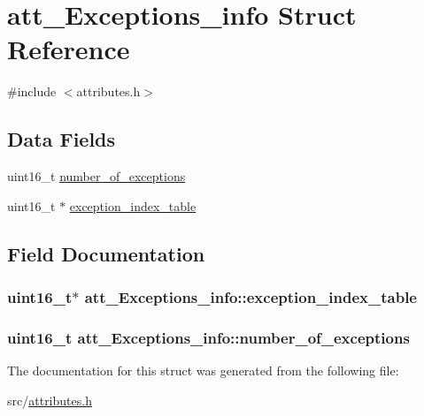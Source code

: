 \hypertarget{structatt__Exceptions__info}{}\section{att\+\_\+\+Exceptions\+\_\+info Struct Reference}
\label{structatt__Exceptions__info}


{\ttfamily \#include $<$attributes.\+h$>$}

\subsection*{Data Fields}
\begin{DoxyCompactItemize}
\item 
uint16\+\_\+t \hyperlink{structatt__Exceptions__info_aa118cef845f2ff9472572598b79ef635}{number\+\_\+of\+\_\+exceptions}
\item 
uint16\+\_\+t $\ast$ \hyperlink{structatt__Exceptions__info_ae713b303537b79289f22216ddbcbfd56}{exception\+\_\+index\+\_\+table}
\end{DoxyCompactItemize}


\subsection{Field Documentation}
\subsubsection[{\texorpdfstring{exception\+\_\+index\+\_\+table}{exception_index_table}}]{\setlength{\rightskip}{0pt plus 5cm}uint16\+\_\+t$\ast$ att\+\_\+\+Exceptions\+\_\+info\+::exception\+\_\+index\+\_\+table}\hypertarget{structatt__Exceptions__info_ae713b303537b79289f22216ddbcbfd56}{}\label{structatt__Exceptions__info_ae713b303537b79289f22216ddbcbfd56}
\subsubsection[{\texorpdfstring{number\+\_\+of\+\_\+exceptions}{number_of_exceptions}}]{\setlength{\rightskip}{0pt plus 5cm}uint16\+\_\+t att\+\_\+\+Exceptions\+\_\+info\+::number\+\_\+of\+\_\+exceptions}\hypertarget{structatt__Exceptions__info_aa118cef845f2ff9472572598b79ef635}{}\label{structatt__Exceptions__info_aa118cef845f2ff9472572598b79ef635}


The documentation for this struct was generated from the following file\+:\begin{DoxyCompactItemize}
\item 
src/\hyperlink{attributes_8h}{attributes.\+h}\end{DoxyCompactItemize}
